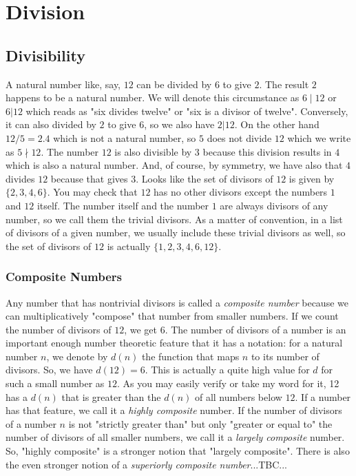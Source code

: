 \section{Division} 

\subsection{Divisibility}
A natural number like, say, $12$ can be divided by $6$ to give $2$. The result $2$ happens to be a natural number. We will denote this circumstance as $6 \mid 12$ or $6 | 12$ which reads as "six divides twelve" or "six is a divisor of twelve". Conversely, it can also divided by $2$ to give $6$, so we also have $2 | 12$. On the other hand $12 / 5 = 2.4$ which is not a natural number, so $5$ does not divide $12$ which we write as $5 \nmid 12$. The number $12$ is also divisible by $3$ because this division results in $4$ which is also a natural number. And, of course, by symmetry, we have also that $4$ divides $12$ because that gives $3$. Looks like the set of divisors of $12$ is given by $\{2,3,4,6\}$. You may check that $12$ has no other divisors except the numbers $1$ and $12$ itself. The number itself and the number $1$ are always divisors of any number, so we call them the trivial divisors. As a matter of convention, in a list of divisors of a given number, we usually include these trivial divisors as well, so the set of divisors of $12$ is actually $\{1,2,3,4,6,12\}$. 

\subsubsection{Composite Numbers}
Any number that has nontrivial divisors is called a \emph{composite number} because we can multiplicatively "compose" that number from smaller numbers. If we count the number of divisors of $12$, we get $6$. The number of divisors of a number is an important enough number theoretic feature that it has a notation: for a natural number $n$, we denote by $d(n)$ the function that maps $n$ to its number of divisors. So, we have $d(12) = 6$. This is actually a quite high value for $d$ for such a small number as $12$. As you may easily verify or take my word for it, 12 has a $d(n)$ that is greater than the $d(n)$ of all numbers below $12$. If a number has that feature, we call it a \emph{highly composite} number. If the number of divisors of a number $n$ is not "strictly greater than" but only "greater or equal to" the number of divisors of all smaller numbers, we call it a \emph{largely composite} number. So, "highly composite" is a stronger notion that "largely composite". There is also the even stronger notion of a \emph{superiorly composite number}...TBC...

